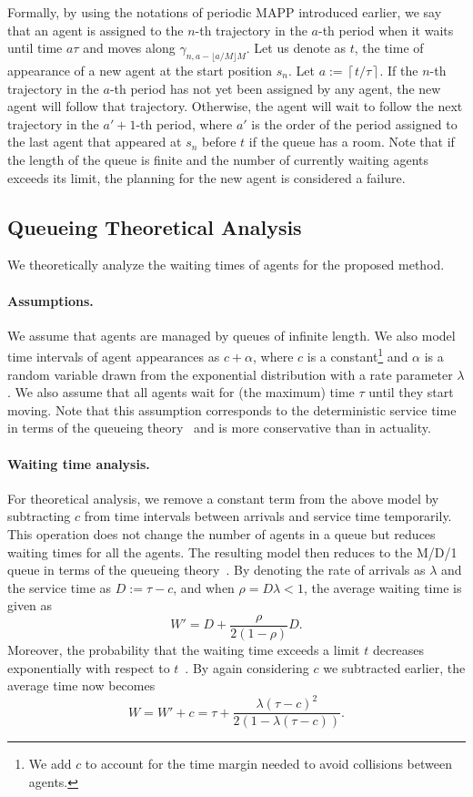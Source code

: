 \documentclass[letterpaper]{article} %
\begin{document}
Formally, by using the notations of periodic MAPP introduced earlier, we say that an agent is assigned to the $n$-th trajectory in the $a$-th period when it waits until time $a\tau$ and moves along $\gamma_{n,a-\lfloor a/M \rfloor M}$. Let us denote as $t$, the time of appearance of a new agent at the start position $s_n$. Let $a:=\left\lceil t/\tau \right\rceil$. If the $n$-th trajectory in the $a$-th period has not yet been assigned by any agent, the new agent will follow that trajectory. Otherwise, the agent will wait to follow the next trajectory in the $a'+1$-th period, where $a'$ is the order of the period assigned to the last agent that appeared at $s_n$ before $t$ if the queue has a room. Note that if the length of the queue is finite and the number of currently waiting agents exceeds its limit, the planning for the new agent is considered a failure.

\subsection{Queueing Theoretical Analysis}
We theoretically analyze the waiting times of agents for the proposed method.

\paragraph{Assumptions.} We assume that agents are managed by queues of infinite length. We also model time intervals of agent appearances as $c+\alpha$, where $c$ is a constant\footnote{We add $c$ to account for the time margin needed to avoid collisions between agents.} and $\alpha$ is a random variable drawn from the exponential distribution with a rate parameter $\lambda$. We also assume that all agents wait for (the maximum) time $\tau$ until they start moving. Note that this assumption corresponds to the deterministic service time in terms of the queueing theory~\cite{kendall1953stochastic} and is more conservative than in actuality.

\paragraph{Waiting time analysis.}
For theoretical analysis, we remove a constant term from the above model by subtracting $c$ from time intervals between arrivals and service time temporarily. This operation does not change the number of agents in a queue but reduces waiting times for all the agents.
The resulting model then reduces to the M/D/1 queue in terms of the queueing theory~\cite{kendall1953stochastic}. By denoting the rate of arrivals as $\lambda$ and the service time as $D:=\tau-c$, and when $\rho = D\lambda < 1$, the average waiting time is given as
\begin{equation}
W'=D+\frac{\rho}{2(1-\rho)}D.
\end{equation}
Moreover, the probability that the waiting time exceeds a limit $t$ decreases exponentially with respect to $t$~\cite{erlang1909theory}.
By again considering $c$ we subtracted earlier, the average time now becomes
\begin{equation}
W=W'+c=\tau+\frac{\lambda (\tau-c)^2}{2(1-\lambda (\tau-c))}.
\end{equation}
\end{document}
